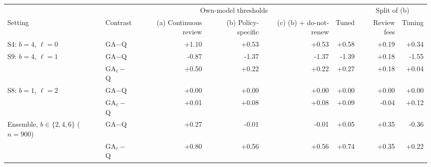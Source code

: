 \begin{tabular}{@{}llrrrrrr@{}}
\toprule
 & & \multicolumn{3}{c}{Own-model thresholds} & & \multicolumn{2}{c}{Split of (b)} \\
\cmidrule(lr){3-5}\cmidrule(l){7-8}
Setting & Contrast & (a) Continuous review & (b) Policy-specific & (c) (b) + do-not-renew & Tuned & Review fees & Timing \\
\midrule
S4: $b=4$, $\ell=0$ & GA$-$Q & +1.10 & +0.53 & +0.53 & +0.58 & +0.19 & +0.34 \\
S9: $b=4$, $\ell=1$ & GA$-$Q & -0.87 & -1.37 & -1.37 & -1.39 & +0.18 & -1.55 \\
 & GA$_\ell-$Q & +0.50 & +0.22 & +0.22 & +0.27 & +0.18 & +0.04 \\
S8: $b=1$, $\ell=2$ & GA$-$Q & +0.00 & +0.00 & +0.00 & +0.00 & +0.00 & +0.00 \\
 & GA$_\ell-$Q & +0.01 & +0.08 & +0.08 & +0.09 & -0.04 & +0.12 \\
\addlinespace[2pt]
Ensemble, $b\in\{2,4,6\}$ ($n=900$) & GA$-$Q & +0.27 & -0.01 & -0.01 & +0.05 & +0.35 & -0.36 \\
 & GA$_\ell-$Q & +0.80 & +0.56 & +0.56 & +0.74 & +0.35 & +0.22 \\
\bottomrule
\end{tabular}